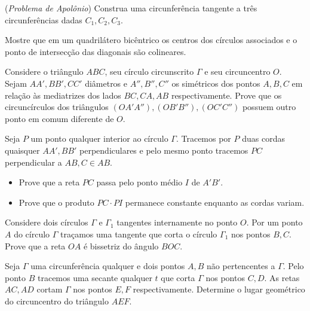 \begin{questao}
  ({\it Problema de Apolônio}) Construa uma circunferência
  tangente a três circunferências dadas $C_1,C_2,C_3$.
\end{questao}

\begin{questao}
  Mostre que em um quadrilátero bicêntrico os centros dos
  círculos associados e o ponto de intersecção das diagonais são
  colineares.
\end{questao}

\begin{questao}
  Considere o triângulo $ABC$, seu círculo circunscrito
  $\Gamma$ e seu circuncentro $O$. Sejam $AA',
  BB',CC'$ diâmetros e $A'',B'',C''$
  os simétricos dos pontos $A,B,C$ em relação às mediatrizes dos
  lados $BC,CA,AB$ respectivamente. Prove que os circuncírculos dos
  triângulos $(O A' A''),(O B' B''),(O
  C' C'')$ possuem outro ponto em comum diferente de
  $O$.
\end{questao}

\begin{questao}
  Seja $P$ um ponto qualquer interior ao círculo
  $\Gamma$. Tracemos por $P$ duas cordas quaisquer
  $AA',BB'$ perpendiculares e pelo mesmo ponto tracemos
  $PC$ perpendicular a $AB, C \in AB$.
  \begin{itemize}
    \item Prove que a reta $PC$ passa pelo ponto médio $I$ de
    $A' B'$.

    \item Prove que o produto $PC \cdot PI$ permanece constante
    enquanto as cordas variam.
  \end{itemize}
\end{questao}

\begin{questao}
  Considere dois círculos $\Gamma$ e $\Gamma_1$
  tangentes internamente no ponto $O$. Por um ponto $A$ do círculo
  $\Gamma$ traçamos uma tangente que corta o círculo $\Gamma_1$
  nos pontos $B,C$. Prove que a reta $OA$ é bissetriz do ângulo
  $BOC$.
\end{questao}

\begin{questao}
  Seja $\Gamma$ uma circunferência qualquer e dois pontos
  $A,B$ não pertencentes a $\Gamma$. Pelo ponto $B$ tracemos uma
  secante qualquer $t$ que corta $\Gamma$ nos pontos $C,D$. As
  retas $AC,AD$ cortam $\Gamma$ nos pontos $E,F$
  respectivamente. Determine o lugar geométrico do circuncentro do
  triângulo $AEF$.
\end{questao}

